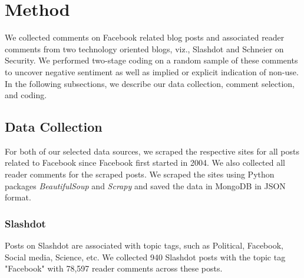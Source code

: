 \section{Method}
\label{sec:method}
We collected comments on Facebook related blog posts and associated reader comments from two technology oriented blogs, viz., Slashdot and Schneier on Security. We performed two-stage coding on a random sample of these comments to uncover negative sentiment as well as implied or explicit indication of non-use. In the following subsections, we describe our data collection, comment selection, and coding.
\subsection{Data Collection}
For both of our selected data sources, we scraped the respective sites for all posts related to Facebook since Facebook first started in 2004. We also collected all reader comments for the scraped posts. We scraped the sites using Python packages \textit{BeautifulSoup} and \textit{Scrapy} and saved the data in MongoDB in JSON format.

\subsubsection{Slashdot}
Posts on Slashdot are associated with topic tags, such as Political, Facebook, Social media, Science, etc. We collected 940 Slashdot posts with the topic tag "Facebook" with 78,597 reader comments across these posts.

